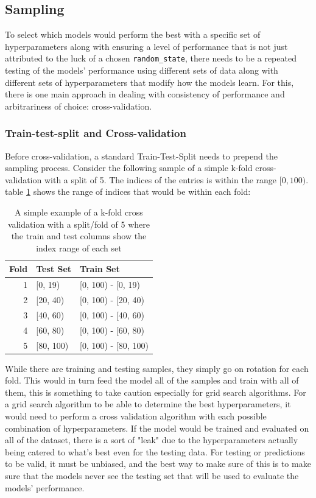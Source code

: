 \subsection{Sampling}

To select which models would perform the best with a specific set of hyperparameters along with ensuring a level of performance that is not just attributed to the luck of a chosen \texttt{random\_state}, there needs to be a repeated testing of the models' performance using different sets of data along with different sets of hyperparameters that modify how the models learn. For this, there is one main approach in dealing with consistency of performance and arbitrariness of choice: cross-validation.

\subsubsection{Train-test-split and Cross-validation}

Before cross-validation, a standard Train-Test-Split needs to prepend the sampling process. Consider the following sample of a simple k-fold cross-validation with a split of 5. The indices of the entries is within the range $[0, 100)$. table \ref{tab:kfold} shows the range of indices that would be within each fold:

\begin{table}[H]
    \caption{A simple example of a k-fold cross validation with a split/fold of 5 where the train and test columns show the index range of each set}
    \label{tab:kfold}
    \begin{tabularx}{\linewidth}{r|>{\centering}X>{\centering\arraybackslash}X}
        \toprule
        Fold & Test Set & Train Set\\
        \midrule
        1 & [0, 19) & [0, 100) - [0, 19)\\
        2 & [20, 40) & [0, 100) - [20, 40)\\
        3 & [40, 60) & [0, 100) - [40, 60)\\
        4 & [60, 80) & [0, 100) - [60, 80)\\
        5 & [80, 100) & [0, 100) - [80, 100)\\
        \bottomrule
    \end{tabularx}
\end{table}

While there are training and testing samples, they simply go on rotation for each fold. This would in turn feed the model all of the samples and train with all of them, this is something to take caution especially for grid search algorithms. For a grid search algorithm to be able to determine the best hyperparameters, it would need to perform a cross validation algorithm with each possible combination of hyperparameters. If the model would be trained and evaluated on all of the dataset, there is a sort of "leak" due to the hyperparameters actually being catered to what's best even for the testing data. For testing or predictions to be valid, it must be unbiased, and the best way to make sure of this is to make sure that the models never see the testing set that will be used to evaluate the models' performance. 

